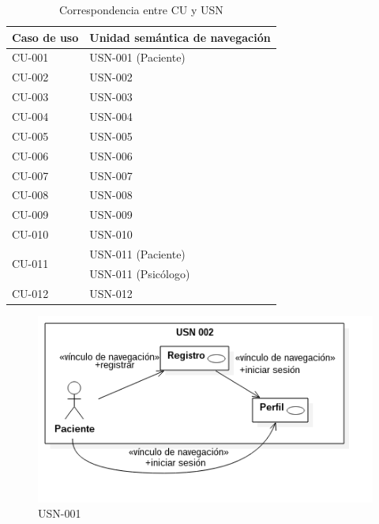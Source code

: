 \begin{table}[htpb]
\centering
\begin{tabular}{|l|l|}
\hline
\textbf{Caso de uso}    & \textbf{Unidad semántica de navegación} \\ \hline
CU-001                  & USN-001 (Paciente)                      \\ \hline
CU-002                  & USN-002                                 \\ \hline
CU-003                  & USN-003                                 \\ \hline
CU-004                  & USN-004                                 \\ \hline
CU-005                  & USN-005                                 \\ \hline
CU-006                  & USN-006                                 \\ \hline
CU-007                  & USN-007                                 \\ \hline
CU-008                  & USN-008                                 \\ \hline
CU-009                  & USN-009                                 \\ \hline
CU-010                  & USN-010                                 \\ \hline
\multirow{2}{*}{CU-011} & USN-011 (Paciente)                      \\ \cline{2-2} 
                        & USN-011 (Psicólogo)                     \\ \hline
CU-012                  & USN-012                                 \\ \hline
\end{tabular}
\caption{Correspondencia entre CU y USN}
\label{cu_usn}
\end{table}

\begin{figure}[htbp] 
    \centering
    \includegraphics[width=1\textwidth]{figuras/usn/usn001_pac.png}
    \caption{USN-001}
    \label{fig:usn-001}
\end{figure}	

